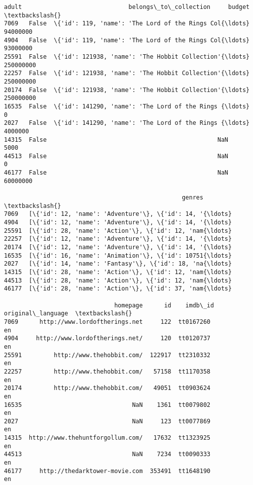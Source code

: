 \documentclass[11pt]{article}
\makeatletter
\newcommand{\boxspacing}{\kern\kvtcb@left@rule\kern\kvtcb@boxsep}
\newcommand{\prompt}[4]{
        {\ttfamily\llap{{\color{#2}[#3]:\hspace{3pt}#4}}\vspace{-\baselineskip}}
    }
\makeatother
\begin{document}
            \begin{tcolorbox}[breakable, size=fbox, boxrule=.5pt, pad at break*=1mm, opacityfill=0]
\prompt{Out}{outcolor}{19}{\boxspacing}
\begin{Verbatim}[commandchars=\\\{\}]
       adult                              belongs\_to\_collection     budget  \textbackslash{}
7069   False  \{'id': 119, 'name': 'The Lord of the Rings Col{\ldots}   94000000
4904   False  \{'id': 119, 'name': 'The Lord of the Rings Col{\ldots}   93000000
25591  False  \{'id': 121938, 'name': 'The Hobbit Collection'{\ldots}  250000000
22257  False  \{'id': 121938, 'name': 'The Hobbit Collection'{\ldots}  250000000
20174  False  \{'id': 121938, 'name': 'The Hobbit Collection'{\ldots}  250000000
16535  False  \{'id': 141290, 'name': 'The Lord of the Rings {\ldots}          0
2027   False  \{'id': 141290, 'name': 'The Lord of the Rings {\ldots}    4000000
14315  False                                                NaN       5000
44513  False                                                NaN          0
46177  False                                                NaN   60000000

                                                  genres  \textbackslash{}
7069   [\{'id': 12, 'name': 'Adventure'\}, \{'id': 14, '{\ldots}
4904   [\{'id': 12, 'name': 'Adventure'\}, \{'id': 14, '{\ldots}
25591  [\{'id': 28, 'name': 'Action'\}, \{'id': 12, 'nam{\ldots}
22257  [\{'id': 12, 'name': 'Adventure'\}, \{'id': 14, '{\ldots}
20174  [\{'id': 12, 'name': 'Adventure'\}, \{'id': 14, '{\ldots}
16535  [\{'id': 16, 'name': 'Animation'\}, \{'id': 10751{\ldots}
2027   [\{'id': 14, 'name': 'Fantasy'\}, \{'id': 18, 'na{\ldots}
14315  [\{'id': 28, 'name': 'Action'\}, \{'id': 12, 'nam{\ldots}
44513  [\{'id': 28, 'name': 'Action'\}, \{'id': 12, 'nam{\ldots}
46177  [\{'id': 28, 'name': 'Action'\}, \{'id': 37, 'nam{\ldots}

                               homepage      id    imdb\_id original\_language  \textbackslash{}
7069      http://www.lordoftherings.net     122  tt0167260                en
4904     http://www.lordoftherings.net/     120  tt0120737                en
25591         http://www.thehobbit.com/  122917  tt2310332                en
22257         http://www.thehobbit.com/   57158  tt1170358                en
20174         http://www.thehobbit.com/   49051  tt0903624                en
16535                               NaN    1361  tt0079802                en
2027                                NaN     123  tt0077869                en
14315  http://www.thehuntforgollum.com/   17632  tt1323925                en
44513                               NaN    7234  tt0090333                en
46177     http://thedarktower-movie.com  353491  tt1648190                en


\end{Verbatim}
\end{tcolorbox}
\end{document}
